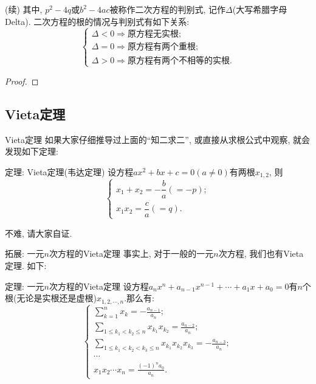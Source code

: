 \documentclass[serif]{beamer}
\begin{document}
\begin{frame}
	\begin{block}{\hspace*{\fill}(续)}
		\kaishu
		其中, $p^2-4q$或$b^2-4ac$被称作二次方程的{\heiti 判别式}, 记作$\Delta$(大写希腊字母Delta). 二次方程的根的情况与判别式有如下关系:
		\[\begin{cases}
			\Delta <0\Rightarrow\text{原方程无实根};\\
			\Delta =0\Rightarrow\text{原方程有两个重根};\\
			\Delta >0\Rightarrow\text{原方程有两个不相等的实根}.
		\end{cases}\]
	\end{block}
\end{frame}

\begin{frame}
	\begin{proof}
		\vspace*{6cm}
	\end{proof}
\end{frame}

\subsection{\kaishu Vieta定理}

\begin{frame}{\kaishu Vieta定理}
	如果大家仔细推导过上面的“知二求二”, 或直接从求根公式中观察, 就会发现如下定理:
	\begin{block}{{\heiti 定理}: {\fangsong Vieta定理(韦达定理)}}
		\kaishu
		设方程$ax^2+bx+c=0(a\neq 0)$有两根$x_{1,2}$, 则
		\[\begin{cases}
			x_1+x_2=-\dfrac{b}{a}(=-p);\\
			x_1x_2=\dfrac{c}{a}(=q).
		\end{cases}\]
	\end{block}
	不难, 请大家自证.
\end{frame}

\begin{frame}{\kaishu *拓展: 一元$n$次方程的Vieta定理}
	事实上, 对于一般的一元$n$次方程, 我们也有Vieta定理. 如下:
	\begin{block}{{\heiti 定理}: {\fangsong 一元$n$次方程的Vieta定理}}
		\kaishu
		设方程$a_nx^n+a_{n-1}x^{n-1}+\cdots+a_1x+a_0=0$有$n$个根(无论是实根还是虚根)$x_{1,2,\cdots,n}$.那么有:
		\[\begin{cases}
			\sum\limits_{k=1}^{n}x_k=-\frac{a_{n-1}}{a_n};\\
			\sum\limits_{1\le k_1<k_2\le n}x_{k_1}x_{k_2}=\frac{a_{n-2}}{a_n};\\
			\sum\limits_{1\le k_1<k_2<k_3\le n}x_{k_1}x_{k_2}x_{k_3}=-\frac{a_{n-3}}{a_n};\\
			\cdots\\
			x_1x_2\cdots x_n=\frac{(-1)^na_0}{a_n}.
		\end{cases}\]
	\end{block}
\end{frame}
\end{document}
